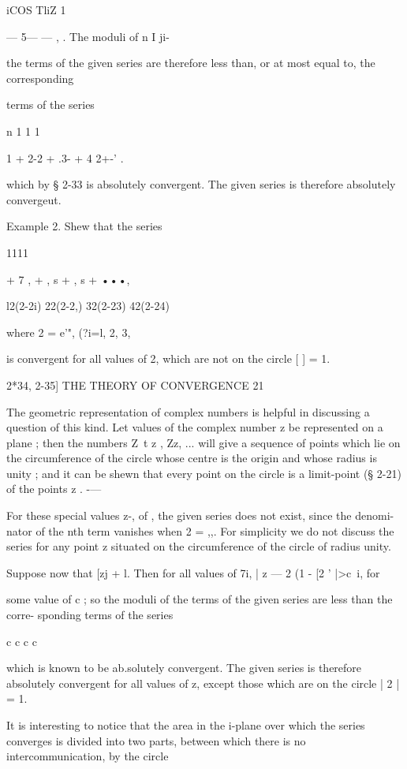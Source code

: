 iCOS TliZ 1 

— 5—   — , . The moduli of 
n  I ji- 

the terms of the given series are therefore less than, or at most equal to, the corresponding 

terms of the series 

n 1 1 1 

1 + 2-2 + .3-  + 4 2+-' . 

which by § 2-33 is absolutely convergent. The given series is therefore absolutely 
convergeut. 

Example 2. Shew that the series 

1111 

+ 7 ,   +  , s +  ,  s + •••, 



l2(2-2i) 22(2-2,) 32(2-23) 42(2-24) 

where 2  = e'", (?i=l, 2, 3, 

is convergent for all values of 2, which are not on the circle [   ] = 1. 



2*34, 2-35] THE THEORY OF CONVERGENCE 21 

The geometric representation of complex numbers is helpful in discussing a question of 
this kind. Let values of the complex number z be represented on a plane ; then the 
numbers Z\ t z , Zz, ... will give a sequence of points which lie on the circumference of the 
circle whose centre is the origin and whose radius is unity ; and it can be shewn that 
every point on the circle is a limit-point (§ 2-21) of the points z . -— 

For these special values z-,  of  , the given series does not exist, since the denomi- 
nator of the nth term vanishes when 2 =  ,,. For simplicity we do not discuss the series 
for any point z situated on the circumference of the circle of radius unity. 

Suppose now that [zj + l. Then for all values of 7i, | z — 2    (1 - [2 '  |>c~i, for 

some value of c ; so the moduli of the terms of the given series are less than the corre- 
sponding terms of the series 

c c c c 

which is known to be ab.solutely convergent. The given series is therefore absolutely 
convergent for all values of z, except those which are on the circle | 2 | = 1. 

It is interesting to notice that the area in the i-plane over which the series converges 
is divided into two parts, between which there is no intercommunication, by the circle 

